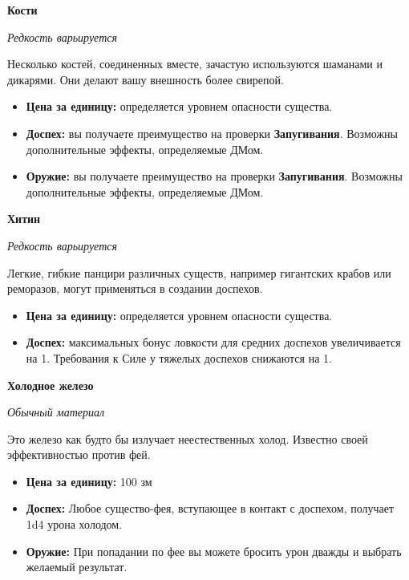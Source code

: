 \documentclass[a4paper, 9pt, twocolumn]{book}
\begin{document}
	\noindent \textbf{Кости}
	
	\noindent \textit{Редкость варьируется}
	
	\smallskip
	
	\noindent Несколько костей, соединенных вместе, зачастую используются шаманами и дикарями. Они делают вашу внешность более свирепой.
	
	\begin{itemize}
		\item \textbf{Цена за единицу:} определяется уровнем опасности существа.
		
		\item \textbf{Доспех:} вы получаете преимущество на проверки \textbf{Запугивания}. Возможны дополнительные эффекты, определяемые ДМом.
		
		\item \textbf{Оружие:} вы получаете преимущество на проверки \textbf{Запугивания}. Возможны дополнительные эффекты, определяемые ДМом.
	\end{itemize}
	
	\noindent \textbf{Хитин}
	
	\noindent \textit{Редкость варьируется}
	
	\smallskip
	
	\noindent Легкие, гибкие панцири различных существ, например гигантских крабов или реморазов, могут применяться в создании доспехов.
	
	\begin{itemize}
		\item \textbf{Цена за единицу:} определяется уровнем опасности существа.
		
		\item \textbf{Доспех:} максимальных бонус ловкости для средних доспехов увеличивается на 1. Требования к Силе у тяжелых доспехов снижаются на 1.
	\end{itemize}

	\noindent  \textbf{Холодное железо}
	
	\noindent \textit{Обычный материал}
	
	\smallskip
	
	\noindent Это железо как будто бы излучает неестественных холод. Известно своей эффективностью против фей.
	
	\begin{itemize}
		\item \textbf{Цена за единицу:} 100 зм
		
		\item \textbf{Доспех:} Любое существо-фея, вступающее в контакт с доспехом, получает 1d4 урона холодом.
		
		\item \textbf{Оружие:} При попадании по фее вы можете бросить урон дважды и выбрать желаемый результат.
	\end{itemize}
\end{document}
